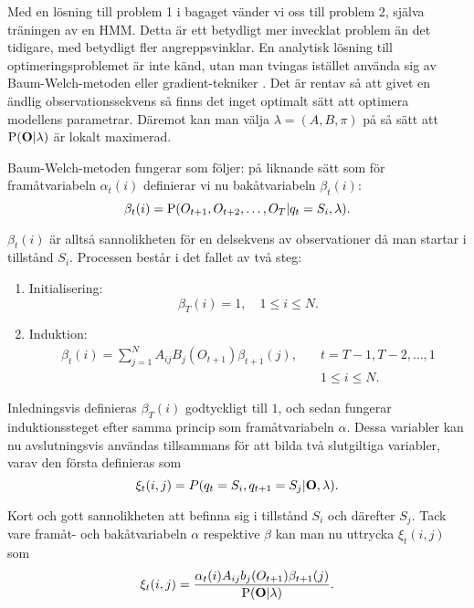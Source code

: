 \documentclass[../rapport_MVEX01-11-05]{subfiles}
\begin{document}
Med en lösning till problem 1 i bagaget vänder vi oss till problem 2,
själva träningen av en HMM. Detta är ett betydligt mer invecklat
problem än det tidigare, med betydligt fler angreppsvinklar. En
analytisk lösning till optimeringsproblemet är inte känd, utan man
tvingas istället använda sig av Baum-Welch-metoden eller
gradient-tekniker \cite{Dempster77,Levinson73}. Det är rentav så att
givet en ändlig observationssekvens så finns det inget optimalt sätt
att optimera modellens parametrar. Däremot kan man välja $\lambda =
(A,B,\pi)$ på så sätt att $\mathrm{P}(\mathbf{O}|\lambda)$ är lokalt
maximerad. 

Baum-Welch-metoden fungerar som följer:
på liknande sätt som för framåtvariabeln $\alpha_t(i)$
definierar vi nu bakåtvariabeln $\beta_t(i)$: 
\begin{equation*}
\beta_t(i) = \mathrm{P}(O_{t+1},O_{t+2},\dots,O_T | q_t = S_i, \lambda).
\end{equation*} 

$\beta_t(i)$ är alltså sannolikheten för en delsekvens av
observationer då man startar i tillstånd $S_i$. Processen består i det
fallet av två steg:
\begin{enumerate}
\item Initialisering: 
\begin{equation*}
\beta_T(i) = 1, \quad 1 \leq i \leq N.
\end{equation*}
\item Induktion: 
\begin{align*}
\beta_t(i) = \sum\limits_{j=1}^NA_{ij}B_j(O_{t+1})\beta_{t+1}(j), \quad &t =
T-1,T-2,\dots,1 \\
&1 \leq i \leq N.
\end{align*}
\end{enumerate}  

Inledningsvis definieras $\beta_T(i)$ godtyckligt till $1$, och sedan
fungerar induktionssteget efter samma princip som framåtvariabeln
$\alpha$. Dessa variabler kan nu avslutningsvis användas tillsammans
för att bilda två slutgiltiga variabler, varav den första definieras som 
\begin{equation*}
\xi_t(i,j) = P(q_t = S_i, q_{t+1} = S_j|\mathbf{O},\lambda).
\end{equation*}

Kort och gott sannolikheten att befinna sig i tillstånd $S_i$ och
därefter $S_j$. Tack vare framåt- och bakåtvariabeln $\alpha$
respektive $\beta$ kan man nu uttrycka $\xi_t(i,j)$ som
\begin{equation*}
\xi_t(i,j) = \frac{\alpha_t(i)A_{ij}b_j(O_{t+1})\beta_{t+1}(j)}{\mathrm{P}(\mathbf{O}|\lambda)}.
\end{equation*} 
\end{document}
